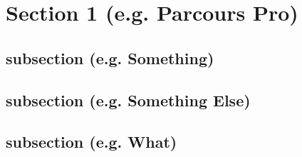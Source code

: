 \section{Section 1 (e.g. Parcours Pro)}

\lipsum[1]

\subsection{subsection (e.g. Something)}

\lipsum[2]

\subsection{subsection (e.g.  Something Else)}

\lipsum[2]

\subsection{subsection (e.g. What)}

\lipsum[2]